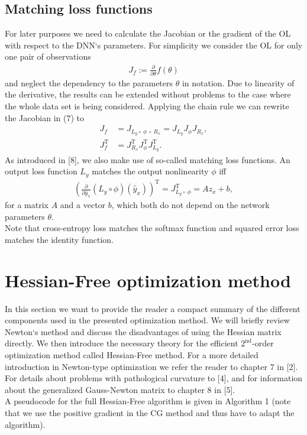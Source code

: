 \documentclass[conference]{IEEEtran}
\begin{document}
	\subsection{Matching loss functions}
	\noindent
	For later purposes we need to calculate the Jacobian or the gradient of the OL with respect to the DNN`s parameters. For simplicity we consider the OL for only one pair of observations
	\begin{align}
	J_{f} := \frac{\partial}{\partial\theta}f(\theta)
	\end{align}
	and neglect the dependency to the parameters $\theta$ in notation.
	Due to linearity of the derivative, the results can be extended without problems to the case where the whole data set is being considered.
	Applying the chain rule we can rewrite the Jacobian in (7) to
	\begin{align}
	J_{f} &= J_{L_{y}\circ \:\phi \:\circ\:R_{x}} = J_{L_{y}} J_{\phi} J_{R_{x}},\\
	J_{f}^{\mathrm{T}} &= J_{R_{x}}^{\mathrm{T}}  J_{\phi}^{\mathrm{T}}  J_{L_{y}}^{\mathrm{T}}.
	\end{align}
	As introduced in [8], we also make use of so-called matching loss functions. An output loss function $L_{y}$ matches the output nonlinearity $\phi$ iff
	\begin{align}
	\left(\frac{\partial}{\partial\hat{y}_{x}}\left(L_{y}\circ \phi\right)(\hat{y}_{x})\right)^{\mathrm{T}}= J_{L_{y}\circ \:\phi}^{\mathrm{T}} = A z_{x} + b,
	\end{align}
	for a matrix $A$ and a vector $b$, which both do not depend on the network parameters $\theta$.\\
	Note that cross-entropy loss matches the softmax function and squared error loss matches the identity function.
	
	
	\section{Hessian-Free optimization method}
	\noindent
	In this section we want to provide the reader a compact summary of the different components used in the presented optimization method. We will briefly review Newton`s method and discuss the disadvantages of using the Hessian matrix directly. We then introduce the necessary theory for the efficient $2^{\text{nd}}$-order optimization method called Hessian-Free method. For a more detailed introduction in Newton-type optimization we refer the reader to chapter 7 in [2]. For details about problems with pathological curvature to [4], and for information about the generalized Gauss-Newton matrix to chapter 8 in [5].\\
	A pseudocode for the full Hessian-Free algorithm is given in Algorithm 1 (note that we use the positive gradient in the CG method and thus have to adapt the algorithm).
	
\end{document}
